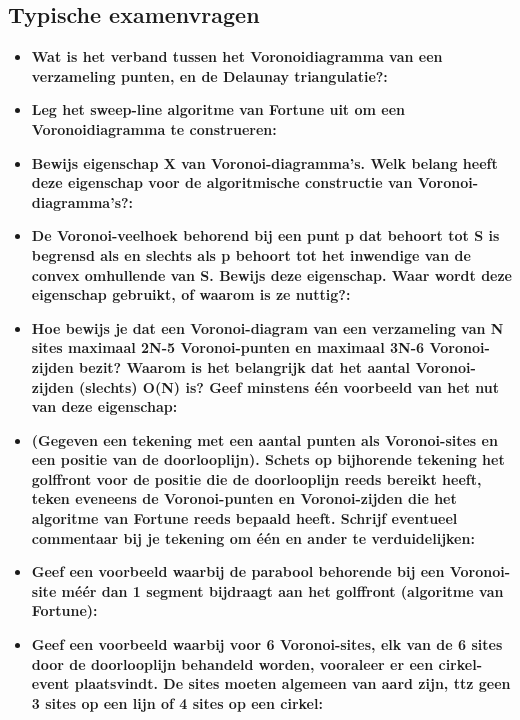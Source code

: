 \documentclass[12pt,a4paper]{article}
\begin{document}
	\subsection{Typische examenvragen}
	\begin{itemize}
		\item \textbf{Wat is het verband tussen het Voronoidiagramma van een verzameling punten, en de Delaunay triangulatie?:}\\
		\item \textbf{Leg het sweep-line algoritme van Fortune uit om een Voronoidiagramma te construeren:}\\
		\item \textbf{Bewijs eigenschap X van Voronoi-diagramma's. Welk belang heeft deze eigenschap voor de algoritmische constructie van Voronoi-diagramma's?:}\\
		\item \textbf{De Voronoi-veelhoek behorend bij een punt p dat behoort tot S is begrensd als en slechts als p behoort tot het inwendige van de convex omhullende van S. Bewijs deze eigenschap. Waar wordt deze eigenschap gebruikt, of waarom is ze nuttig?:}\\
		\item \textbf{Hoe bewijs je dat een Voronoi-diagram van een verzameling van N sites maximaal 2N-5 Voronoi-punten en maximaal 3N-6 Voronoi-zijden bezit? Waarom is het belangrijk dat het aantal Voronoi-zijden (slechts) O(N) is? Geef minstens één voorbeeld van het nut van deze eigenschap:}\\
		\item \textbf{(Gegeven een tekening met een aantal punten als Voronoi-sites en een positie van de doorlooplijn). Schets op bijhorende tekening het golffront voor de positie die de doorlooplijn reeds bereikt heeft, teken eveneens de Voronoi-punten en Voronoi-zijden die het algoritme van Fortune reeds bepaald heeft. Schrijf eventueel commentaar bij je tekening om één en ander te verduidelijken:}\\
		\item \textbf{Geef een voorbeeld waarbij de parabool behorende bij een Voronoi-site méér dan 1 segment bijdraagt aan het golffront (algoritme van Fortune):}\\
		\item \textbf{Geef een voorbeeld waarbij voor 6 Voronoi-sites, elk van de 6 sites door de doorlooplijn behandeld worden, vooraleer er een cirkel-event plaatsvindt. De sites moeten algemeen van aard zijn, ttz geen 3 sites op een lijn of 4 sites op een cirkel:}\\
	\end{itemize}
	
\end{document}
